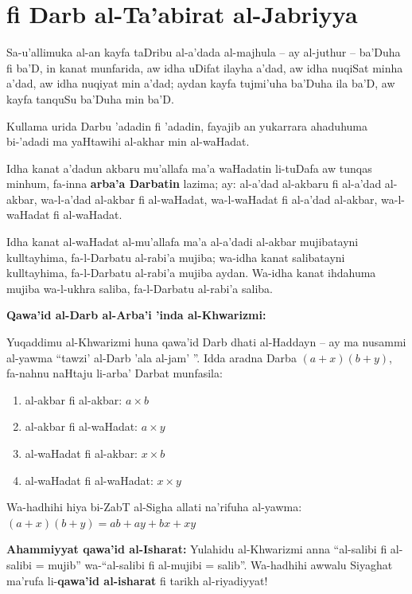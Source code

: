 \documentclass[11pt,a4paper]{book}
\begin{document}
\newpage

\chapter{fi Darb al-Ta'abirat al-Jabriyya}
\label{ch:multiplication}

\begin{originaltext}
Sa-u'allimuka al-an kayfa taDribu al-a'dada al-majhula -- ay
al-juthur -- ba'Duha fi ba'D, in kanat munfarida, aw idha uDifat
ilayha a'dad, aw idha nuqiSat minha a'dad, aw idha nuqiyat min
a'dad; aydan kayfa tujmi'uha ba'Duha ila ba'D, aw kayfa tanquSu
ba'Duha min ba'D.

Kullama urida Darbu 'adadin fi 'adadin, fayajib an yukarrara
ahaduhuma bi-'adadi ma yaHtawihi al-akhar min al-waHadat.

Idha kanat a'dadun akbaru mu'allafa ma'a waHadatin li-tuDafa aw
tunqas minhum, fa-inna \textbf{arba'a Darbatin} lazima; ay: al-a'dad
al-akbaru fi al-a'dad al-akbar, wa-l-a'dad al-akbar fi al-waHadat,
wa-l-waHadat fi al-a'dad al-akbar, wa-l-waHadat fi al-waHadat.

Idha kanat al-waHadat al-mu'allafa ma'a al-a'dadi al-akbar
mujibatayni kulltayhima, fa-l-Darbatu al-rabi'a mujiba; wa-idha
kanat salibatayni kulltayhima, fa-l-Darbatu al-rabi'a mujiba aydan.
Wa-idha kanat ihdahuma mujiba wa-l-ukhra saliba, fa-l-Darbatu
al-rabi'a saliba.
\end{originaltext}

\begin{commentary}
\textbf{Qawa'id al-Darb al-Arba'i 'inda al-Khwarizmi:}

Yuqaddimu al-Khwarizmi huna qawa'id Darb dhati al-Haddayn -- ay ma
nusammi al-yawma ``tawzi' al-Darb 'ala al-jam' ''. Idda aradna Darba
$(a + x)(b + y)$, fa-nahnu naHtaju li-arba' Darbat munfasila:

\begin{enumerate}
  \item al-akbar fi al-akbar: $a \times b$
  \item al-akbar fi al-waHadat: $a \times y$
  \item al-waHadat fi al-akbar: $x \times b$
  \item al-waHadat fi al-waHadat: $x \times y$
\end{enumerate}

Wa-hadhihi hiya bi-ZabT al-Sigha allati na'rifuha al-yawma:
$(a + x)(b + y) = ab + ay + bx + xy$

\textbf{Ahammiyyat qawa'id al-Isharat:} Yulahidu al-Khwarizmi anna
``al-salibi fi al-salibi = mujib'' wa-``al-salibi fi al-mujibi
= salib''. Wa-hadhihi awwalu Siyaghat ma'rufa li-\textbf{qawa'id
al-isharat} fi tarikh al-riyadiyyat!
\end{commentary}
\end{document}
